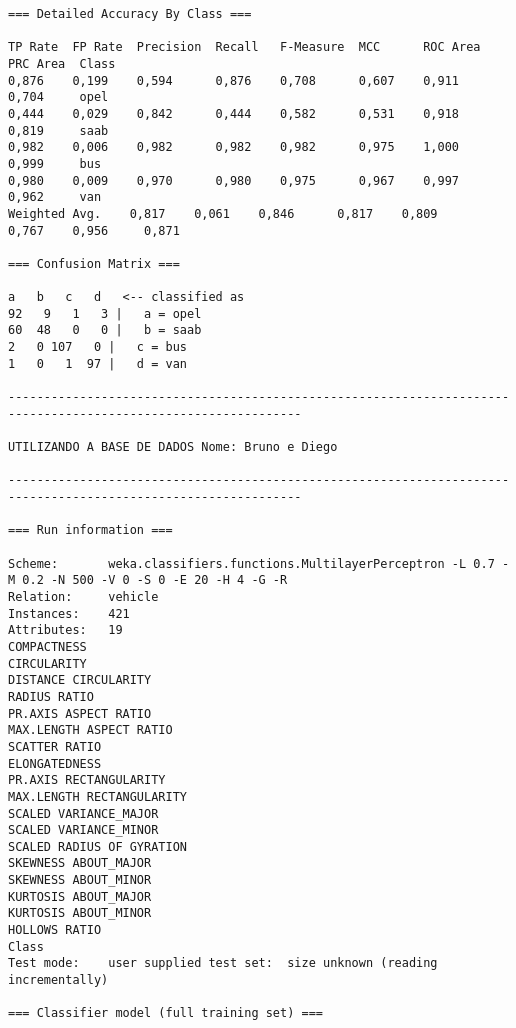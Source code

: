 \documentclass[
	article,			%
	11pt,				%
	oneside,			%
	a4paper,			%
	english,			%
	brazil,				%
	sumario=tradicional
	]{abntex2}
\begin{document}
\begin{lstlisting}
=== Detailed Accuracy By Class ===

TP Rate  FP Rate  Precision  Recall   F-Measure  MCC      ROC Area  PRC Area  Class
0,876    0,199    0,594      0,876    0,708      0,607    0,911     0,704     opel
0,444    0,029    0,842      0,444    0,582      0,531    0,918     0,819     saab
0,982    0,006    0,982      0,982    0,982      0,975    1,000     0,999     bus
0,980    0,009    0,970      0,980    0,975      0,967    0,997     0,962     van
Weighted Avg.    0,817    0,061    0,846      0,817    0,809      0,767    0,956     0,871     

=== Confusion Matrix ===

a   b   c   d   <-- classified as
92   9   1   3 |   a = opel
60  48   0   0 |   b = saab
2   0 107   0 |   c = bus
1   0   1  97 |   d = van

---------------------------------------------------------------------------------------------------------------

UTILIZANDO A BASE DE DADOS Nome: Bruno e Diego

---------------------------------------------------------------------------------------------------------------

=== Run information ===

Scheme:       weka.classifiers.functions.MultilayerPerceptron -L 0.7 -M 0.2 -N 500 -V 0 -S 0 -E 20 -H 4 -G -R
Relation:     vehicle
Instances:    421
Attributes:   19
COMPACTNESS
CIRCULARITY
DISTANCE CIRCULARITY
RADIUS RATIO
PR.AXIS ASPECT RATIO
MAX.LENGTH ASPECT RATIO
SCATTER RATIO
ELONGATEDNESS
PR.AXIS RECTANGULARITY
MAX.LENGTH RECTANGULARITY
SCALED VARIANCE_MAJOR
SCALED VARIANCE_MINOR
SCALED RADIUS OF GYRATION
SKEWNESS ABOUT_MAJOR
SKEWNESS ABOUT_MINOR
KURTOSIS ABOUT_MAJOR
KURTOSIS ABOUT_MINOR
HOLLOWS RATIO
Class
Test mode:    user supplied test set:  size unknown (reading incrementally)

=== Classifier model (full training set) ===


\end{lstlisting}
\end{document}
